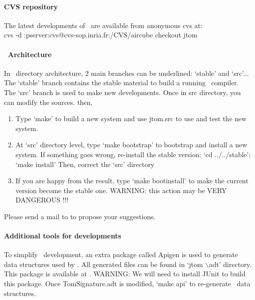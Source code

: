 \paragraph{CVS repository}
The latest developments of \TOM\ are available from anonymous cvs at:
\\cvs -d :pserver:cvs@cvs-sop.inria.fr:/CVS/aircube checkout jtom
\paragraph{\TOM\ Architecture}
In \TOM\ directory architecture, 2 main branches can be underlined:
`stable' and `src'...
The `stable' branch contains the stable material to build a running
\TOM\ compiler. The `src' branch is used to make new developments.
Once in src directory, you can modify the sources. then, 
\begin{enumerate}
\item Type `make' to build a new system and use jtom.src to use and
  test the new system.
\item At `src' directory level, type `make bootstrap' to bootstrap and
  install a new system.
  If something goes wrong, re-install the stable version:
  `cd ../../stable'; `make install'
  Then, correct the `src' directory
\item If you are happy from the result, type `make bootinstall' to
  make the current version become the stable one.   WARNING: this action may be VERY DANGEROUS !!!
\end{enumerate}
Please send a mail to  to propose your
suggestions.

\paragraph{Additional tools for developments}
To simplify \TOM\ development, an extra package called Apigen is used
to generate data structures used by \TOM. All generated files can be
found in `jtom $\backslash$adt' directory.
\\This package is available at
.
WARNING: We will need to install JUnit to build this package.
Once TomSignature.adt is modified, `make api' to re-generate \TOM\
data structures.
 
